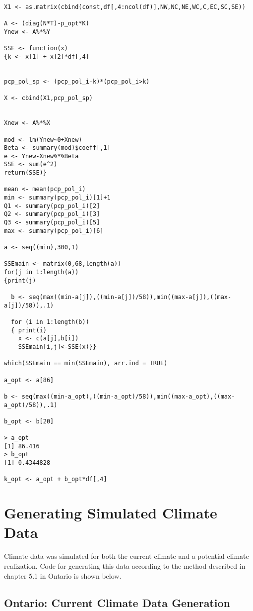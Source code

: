 \begin{lstlisting}
X1 <- as.matrix(cbind(const,df[,4:ncol(df)],NW,NC,NE,WC,C,EC,SC,SE))

A <- (diag(N*T)-p_opt*K)
Ynew <- A%*%Y

SSE <- function(x)
{k <- x[1] + x[2]*df[,4]


pcp_pol_sp <- (pcp_pol_i-k)*(pcp_pol_i>k)

X <- cbind(X1,pcp_pol_sp)


Xnew <- A%*%X

mod <- lm(Ynew~0+Xnew)
Beta <- summary(mod)$coeff[,1]
e <- Ynew-Xnew%*%Beta
SSE <- sum(e^2)
return(SSE)}

mean <- mean(pcp_pol_i)
min <- summary(pcp_pol_i)[1]+1
Q1 <- summary(pcp_pol_i)[2]
Q2 <- summary(pcp_pol_i)[3]
Q3 <- summary(pcp_pol_i)[5]
max <- summary(pcp_pol_i)[6]

a <- seq((min),300,1)

SSEmain <- matrix(0,68,length(a))
for(j in 1:length(a))
{print(j)
  
  b <- seq(max((min-a[j]),((min-a[j])/58)),min((max-a[j]),((max-a[j])/58)),.1)
  
  for (i in 1:length(b))
  { print(i)
    x <- c(a[j],b[i])
    SSEmain[i,j]<-SSE(x)}}

which(SSEmain == min(SSEmain), arr.ind = TRUE)

a_opt <- a[86]

b <- seq(max((min-a_opt),((min-a_opt)/58)),min((max-a_opt),((max-a_opt)/58)),.1)

b_opt <- b[20]

> a_opt
[1] 86.416
> b_opt
[1] 0.4344828

k_opt <- a_opt + b_opt*df[,4]

\end{lstlisting}

\section{Generating Simulated Climate Data}

Climate data was simulated for both the current climate and a potential climate realization. Code for generating this data according to the method described in chapter 5.1 in Ontario is shown below.

\subsection{Ontario: Current Climate Data Generation}

